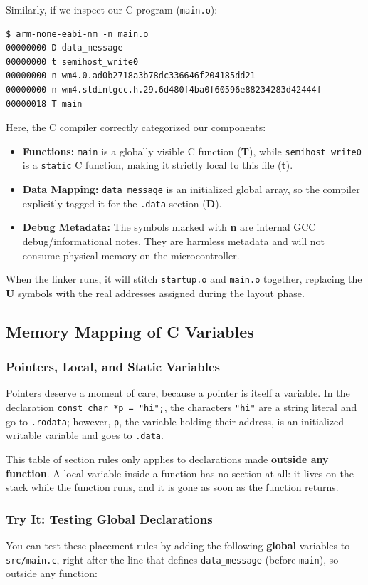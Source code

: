 Similarly, if we inspect our C program (\texttt{main.o}):
\begin{lstlisting}
$ arm-none-eabi-nm -n main.o
00000000 D data_message
00000000 t semihost_write0
00000000 n wm4.0.ad0b2718a3b78dc336646f204185dd21
00000000 n wm4.stdintgcc.h.29.6d480f4ba0f60596e88234283d42444f
00000018 T main
\end{lstlisting}
Here, the C compiler correctly categorized our components:
\begin{itemize}
    \item \textbf{Functions:} \texttt{main} is a globally visible C function (\textbf{T}), while \texttt{semihost\_write0} is a \texttt{static} C function, making it strictly local to this file (\textbf{t}).
    \item \textbf{Data Mapping:} \texttt{data\_message} is an initialized global array, so the compiler explicitly tagged it for the \texttt{.data} section (\textbf{D}).
    \item \textbf{Debug Metadata:} The symbols marked with \textbf{n} are internal GCC debug/informational notes. They are harmless metadata and will not consume physical memory on the microcontroller.
\end{itemize}
When the linker runs, it will stitch \texttt{startup.o} and \texttt{main.o} together, replacing the \textbf{U} symbols with the real addresses assigned during the layout phase.

\subsection{Memory Mapping of C Variables}
\subsubsection{Pointers, Local, and Static Variables}
Pointers deserve a moment of care, because a pointer is itself a variable. In the declaration \texttt{const char *p = "hi";}, the characters \texttt{"hi"} are a string literal and go to \texttt{.rodata}; however, \texttt{p}, the variable holding their address, is an initialized writable variable and goes to \texttt{.data}.

This table of section rules only applies to declarations made \textbf{outside any function}. A local variable inside a function has no section at all: it lives on the stack while the function runs, and it is gone as soon as the function returns.

\subsubsection{Try It: Testing Global Declarations}
You can test these placement rules by adding the following \textbf{global} variables to \texttt{src/main.c}, right after the line that defines \texttt{data\_message} (before \texttt{main}), so outside any function:

